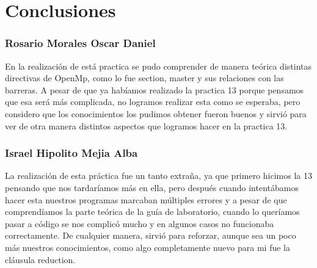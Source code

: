\documentclass[12pt,letterpaper]{article}
\begin{document}
\section{Conclusiones}

\subsubsection*{Rosario Morales Oscar Daniel }
En la realización de está practica se pudo comprender de manera teórica distintas directivas de OpenMp, como lo fue section, master y sus relaciones con las barreras. A pesar de que ya habíamos realizado la practica 13 porque pensamos que esa será más complicada, no logramos realizar esta como se esperaba, pero considero que los conocimientos los pudimos obtener fueron buenos y sirvió para ver de otra manera distintos aspectos que logramos hacer en la practica 13.

\subsubsection*{Israel Hipolito Mejia 
Alba}
La realización de esta práctica fue un tanto extraña, ya que primero hicimos la 13 pensando que nos tardaríamos más en ella, pero después cuando intentábamos hacer esta nuestros programas marcaban múltiples errores y a pesar de que comprendíamos la parte teórica de la guía de laboratorio, cuando lo queríamos pasar a código se nos complicó mucho y en algunos casos no funcionaba correctamente. De cualquier manera, sirvió para reforzar, aunque sea un poco más nuestros conocimientos, como algo completamente nuevo para mi fue la cláusula reduction.
\end{document}
